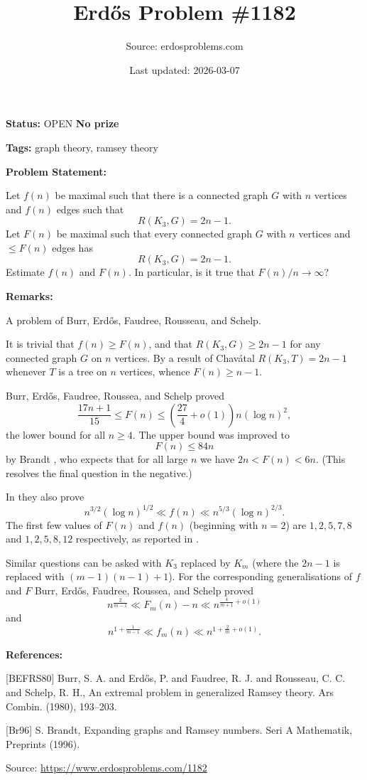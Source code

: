 \documentclass{article}
\title{Erd\H{o}s Problem \#1182}
\date{Last updated: 2026-03-07}
\author{Source: erdosproblems.com}
\begin{document}
\maketitle

\noindent\textbf{Status:} OPEN \quad \textbf{No prize}

\noindent\textbf{Tags:} graph theory, ramsey theory

\medskip
\noindent\textbf{Problem Statement:}

Let $f(n)$ be maximal such that there is a connected graph $G$ with $n$ vertices and $f(n)$ edges such that\[R(K_3,G)= 2n-1.\]Let $F(n)$ be maximal such that every connected graph $G$ with $n$ vertices and $\leq F(n)$ edges has\[R(K_3,G)= 2n-1.\]Estimate $f(n)$ and $F(n)$. In particular, is it true that $F(n)/n\to \infty$?

\bigskip
\noindent\textbf{Remarks:}

A problem of Burr, Erd\H{o}s, Faudree, Rousseau, and Schelp. 

It is trivial that $f(n)\geq F(n)$, and that $R(K_3,G)\geq 2n-1$ for any connected graph $G$ on $n$ vertices. By a result of Chav\'{a}tal $R(K_3,T)=2n-1$ whenever $T$ is a tree on $n$ vertices, whence $F(n)\geq n-1$.

Burr, Erd\H{o}s, Faudree, Roussea, and Schelp \cite{BEFRS80} proved\[\frac{17n+1}{15}\leq F(n)\leq \left(\frac{27}{4}+o(1)\right)n(\log n)^2,\]the lower bound for all $n\geq 4$. The upper bound was improved to\[F(n)\leq 84n\]by Brandt \cite{Br96}, who expects that for all large $n$ we have $2n<F(n)<6n$. (This resolves the final question in the negative.)

In \cite{BEFRS80} they also prove\[n^{3/2}(\log n)^{1/2} \ll f(n) \ll n^{5/3}(\log n)^{2/3}.\]The first few values of $F(n)$ and $f(n)$ (beginning with $n=2$) are $1,2,5,7,8$ and $1,2,5,8,12$ respectively, as reported in \cite{BEFRS80}. 

Similar questions can be asked with $K_3$ replaced by $K_m$ (where the $2n-1$ is replaced with $(m-1)(n-1)+1$). For the corresponding generalisations of $f$ and $F$ Burr, Erd\H{o}s, Faudree, Roussea, and Schelp \cite{BEFRS80} proved\[n^{\frac{2}{m-1}}\ll F_m(n)-n\ll n^{\frac{4}{m+1}+o(1)}\]and\[n^{1+\frac{1}{m-1}}\ll f_m(n) \ll n^{1+\frac{2}{m}+o(1)}.\]

\bigskip
\noindent\textbf{References:}

[BEFRS80] Burr, S. A. and Erd\H{o}s, P. and Faudree, R. J. and Rousseau,
C. C. and Schelp, R. H., An extremal problem in generalized {R}amsey theory. Ars Combin. (1980), 193--203.
 
 [Br96] S. Brandt, Expanding graphs and Ramsey numbers. Seri A Mathematik, Preprints (1996).

\bigskip
\noindent\small{Source: \url{https://www.erdosproblems.com/1182}}
\end{document}
